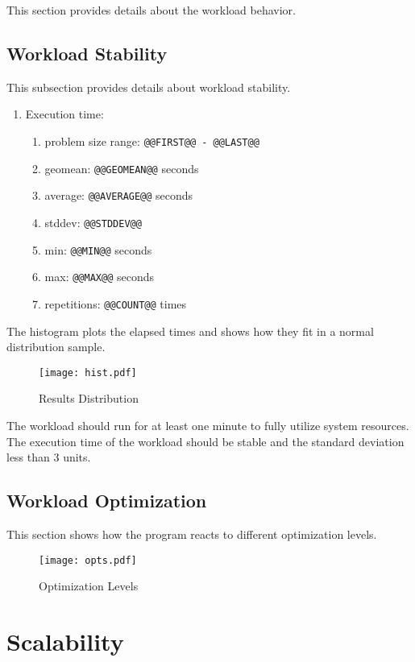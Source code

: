 \documentclass[a4paper]{article}
\begin{document}
This section provides details about the workload behavior.

\subsection{Workload Stability}

This subsection provides details about workload stability.

\begin{enumerate}
\item Execution time:
\begin{enumerate}
\item problem size range: {\tt @@FIRST@@ - @@LAST@@}
\item geomean: {\tt @@GEOMEAN@@} seconds
\item average: {\tt @@AVERAGE@@} seconds
\item stddev: {\tt @@STDDEV@@}
\item min: {\tt @@MIN@@} seconds
\item max: {\tt @@MAX@@} seconds
\item repetitions: {\tt @@COUNT@@} times
\end{enumerate}
\end{enumerate}

The histogram plots the elapsed times and shows how they fit in a normal distribution sample.

\begin{figure}[H]
\label{fig:histogram}
\centering
\texttt{[image: hist.pdf]}
\caption{Results Distribution}
\end{figure}

The workload should run for at least one minute to fully utilize system resources. The execution time of the workload should be stable and the standard deviation less than 3 units.

\subsection{Workload Optimization}

This section shows how the program reacts to different optimization levels.

\begin{figure}[H]
\label{fig:optimizations}
\centering
\texttt{[image: opts.pdf]}
\caption{Optimization Levels}
\end{figure}

\section{Scalability}
\end{document}
